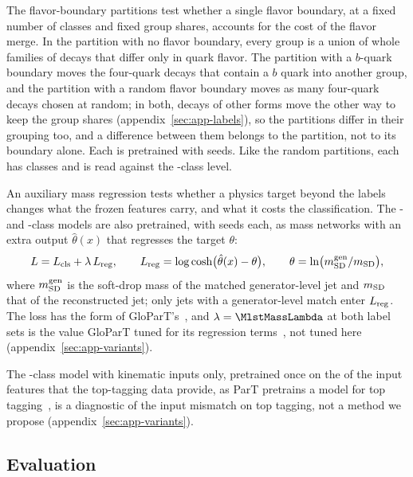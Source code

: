 The flavor-boundary partitions test whether a single flavor boundary, at a fixed number of
classes and fixed group shares, accounts for the cost of the flavor merge. In the partition with no flavor
boundary, every group is a union of whole families of decays that differ only in quark flavor. The partition
with a $b$-quark boundary moves the four-quark decays \RandFlavSplitOrbit{} that contain a $b$ quark into another
group, and the partition with a random flavor boundary moves as many four-quark decays chosen at random; in both,
decays of other forms move the other way to keep the group shares (appendix~\ref{sec:app-labels}), so the
partitions differ in their grouping too, and a difference between them belongs to the partition, not to its boundary
alone. Each is
pretrained with \RandFlavRuns{} seeds. Like the random partitions, each has \Kcoarse{} classes and is read
against the \Kcoarse-class level.

An auxiliary mass regression tests whether a physics target beyond the labels changes what the frozen features
carry, and what it costs the classification. The \Kres- and \Kcoarse-class models are also pretrained, with
\MlstMassNRunsWord{} seeds each, as mass networks with an extra output $\hat\theta(x)$ that regresses the target $\theta$:
\begin{equation}\label{eq:masstarget}
  L = L_{\mathrm{cls}} + \lambda\,L_{\mathrm{reg}}, \qquad L_{\mathrm{reg}} = \log\cosh\bigl(\hat\theta(x) - \theta\bigr), \qquad
  \theta = \ln\bigl(m^{\mathrm{gen}}_{\mathrm{SD}} / m_{\mathrm{SD}}\bigr),
\end{equation}
where $m^{\mathrm{gen}}_{\mathrm{SD}}$ is the soft-drop mass of the matched generator-level jet and $m_{\mathrm{SD}}$ that of the reconstructed
jet; only jets with a generator-level match enter $L_{\mathrm{reg}}$. The loss has the form of GloParT's~\cite[Eqs.~(8.3)
and~(11.7)]{glopart}, and $\lambda = \MlstMassLambda$ at both label sets is the value GloParT tuned for its
regression terms~\cite[Eq.~(11.7)]{glopart}, not tuned here (appendix~\ref{sec:app-variants}).

The \Kfull-class model with kinematic inputs only, pretrained once on the \FillTopNPresent{} of the
\FillNFeatures{} input features that the top-tagging data provide, as ParT pretrains a model for top
tagging~\cite{part}, is a diagnostic of the input mismatch on top tagging, not a method we propose
(appendix~\ref{sec:app-variants}).

\subsection{Evaluation}\label{sec:evaluation}

